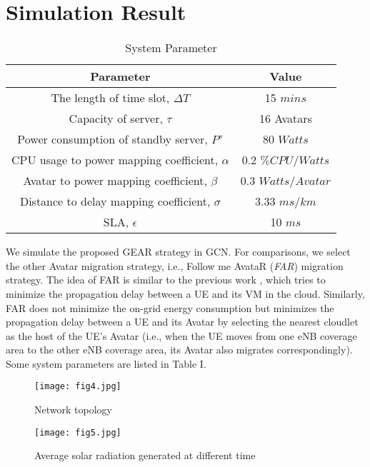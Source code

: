 \documentclass[journal,12pt,draftclsnofoot,onecolumn]{IEEEtran}
\begin{document}
\section{Simulation Result}
\begin{table}[!htb]
	\renewcommand{\arraystretch}{1.3}
	\caption{System Parameter}
	\label{tab:para}
	\centering
	\begin{tabular}{c c}
		\hline
		\hline
		Parameter  &  Value\\
	
		\hline
		
		The length of time slot, $\Delta T$   &   15 $mins$\\
		
		Capacity of server, $\tau$     &   16 Avatars\\ 
		
		Power consumption of standby server, $P^s$ & 80 $Watts$\\
		
		CPU usage to power mapping coefficient, $\alpha$ &  0.2 $\%CPU/Watts$ \\
		
		Avatar to power mapping coefficient, $\beta$		&    0.3 $Watts/Avatar$\\
	
		Distance to delay mapping coefficient, $\sigma$ & 3.33 $ms/km$\\ 
	
		SLA, $\epsilon$  &  10 $ms$\\
	
		\hline
		\hline
	\end{tabular}
\end{table}
We simulate the proposed GEAR strategy in GCN. For comparisons, we select the other Avatar migration strategy, i.e., Follow me AvataR (\emph{FAR}) migration strategy. The idea of FAR is similar to the previous work \cite{7}, which tries to minimize the propagation delay between a UE and its VM in the cloud. Similarly, FAR does not minimize the on-grid energy consumption but minimizes the propagation delay between a UE and its Avatar by selecting the nearest cloudlet as the host of the UE's Avatar (i.e., when the UE moves from one eNB coverage area to the other eNB coverage area, its Avatar also migrates correspondingly). Some system parameters are listed in Table I.\
\begin{figure}[!htb]
	\centering	
\texttt{[image: fig4.jpg]}
	\caption{Network topology}
	\label{fig4}
\end{figure}
\begin{figure}[!htb]
	\centering	
\texttt{[image: fig5.jpg]}
	\caption{Average solar radiation generated at different time}
	\label{fig5}
\end{figure}
\end{document}
